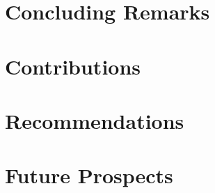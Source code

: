 \section{Concluding Remarks}

\section{Contributions}

\section{Recommendations}

\section{Future Prospects}